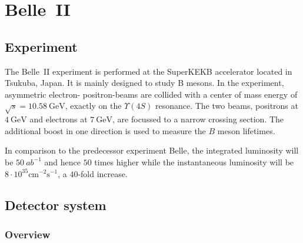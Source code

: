 \chapter{Belle~\RN{2}}
\label{chap:belle2_experiment}

\section{Experiment}
\label{sec:experimental}

The Belle~\RN{2} experiment is performed at the SuperKEKB accelerator located in Tsukuba, Japan. It is mainly designed to study B mesons.
In the experiment, asymmetric electron- positron-beams are collided with a center of mass energy of $\sqrt{s} = 10.58 \mathrm{~GeV}$, exactly on the $\Upsilon (4S)$ resonance. The two beams, positrons at $4 \mathrm{~GeV}$ and electrons at $7 \mathrm{~GeV}$, are focussed to a narrow crossing section. The additional boost in one direction is used to measure the $B$ meson lifetimes.

In comparison to the predecessor experiment Belle, the integrated luminosity will be $50~{ab}^{-1}$ and hence $50$ times higher while the instantaneous luminosity will be $8 \cdot 10^{35} \mathrm{cm}^{-2} \mathrm{s}^{-1}$, a $40$-fold increase.

\section{Detector system}
\label{sec:detector_system}

\subsection{Overview}
\label{sec:detector_system_overview}

